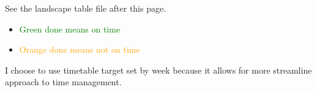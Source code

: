 See the landscape table file after this page.
\begin{itemize}
    \item \textcolor{Green}{Green done means on time}
    \item \textcolor{Orange}{Orange done means not on time}
\end{itemize}
I choose to use timetable target set by week because it allows for more streamline approach to time management.

